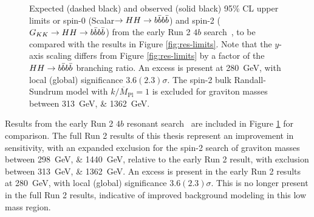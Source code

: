 \begin{figure}[ht]
  \centering
  \vspace*{-3cm}

  \caption{\label{fig:res-limits-early-Run-2} Expected (dashed black) and observed (solid black) 95\% CL upper limits 
  or spin-0 (Scalar\(\rightarrow HH\rightarrow b\bar{b}b\bar{b} \)) and spin-2 (\(G_{KK} \rightarrow HH \rightarrow b\bar{b}b\bar{b}\)) from the
  early Run 2 $4b$ search~\cite{EXOT-2016-31}, to be compared with the results in Figure \ref{fig:res-limits}. Note that 
  the $y$-axis scaling differs from Figure \ref{fig:res-limits} by a factor of the $HH\rightarrow b\bar{b}b\bar{b}$ branching ratio.
  An excess is present at \SI{280}{\GeV}, with local (global) significance $3.6 (2.3)\sigma$. The spin-2 
  bulk Randall-Sundrum model with $k/\overline{M}_{\mathrm{Pl}} = 1$ is excluded for graviton masses between \SIlist{313;1362}{\GeV}.}
\end{figure}

Results from the early Run 2 $4b$ resonant search~\cite{EXOT-2016-31} are included in Figure 
\ref{fig:res-limits-early-Run-2} for comparison. The full Run 2 results of this thesis represent an 
improvement in sensitivity, 
with an expanded exclusion for the spin-2 search of graviton masses between \SIlist{298;1440}{\GeV}, relative 
to the early Run 2 result, 
with exclusion between \SIlist{313;1362}{\GeV}. An excess is present in the early Run 2 results at \SI{280}{\GeV}, 
with local (global) significance $3.6 (2.3)\sigma$. This is no longer present in the full Run 2 results, 
indicative of improved background modeling in this low mass region.

